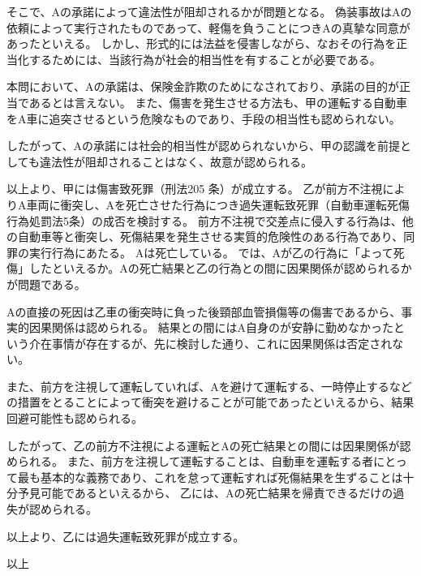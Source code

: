 \documentclass[11pt]{jsarticle}
\begin{document}
		そこで、Aの承諾によって違法性が阻却されるかが問題となる。
		偽装事故はAの依頼によって実行されたものであって、軽傷を負うことにつきAの真摯な同意があったといえる。
		しかし、形式的には法益を侵害しながら、なおその行為を正当化するためには、当該行為が社会的相当性を有することが必要である。
		
		本問において、Aの承諾は、保険金詐欺のためになされており、承諾の目的が正当であるとは言えない。
		また、傷害を発生させる方法も、甲の運転する自動車をA車に追突させるという危険なものであり、手段の相当性も認められない。
		
		したがって、Aの承諾には社会的相当性が認められないから、甲の認識を前提としても違法性が阻却されることはなく、故意が認められる。
		
		以上より、甲には傷害致死罪（刑法205 条）が成立する。
\sectionA{}
	乙が前方不注視によりA車両に衝突し、Aを死亡させた行為につき過失運転致死罪（自動車運転死傷行為処罰法5条）の成否を検討する。
	\sectionB{}
		前方不注視で交差点に侵入する行為は、他の自動車等と衝突し、死傷結果を発生させる実質的危険性のある行為であり、同罪の実行行為にあたる。
		Aは死亡している。
	\sectionB{}
		では、Aが乙の行為に「よって死傷」したといえるか。Aの死亡結果と乙の行為との間に因果関係が認められるかが問題である。
		
		Aの直接の死因は乙車の衝突時に負った後頸部血管損傷等の傷害であるから、事実的因果関係は認められる。
		結果との間にはA自身のが安静に勤めなかったという介在事情が存在するが、先に検討した通り、これに因果関係は否定されない。
		
		また、前方を注視して運転していれば、Aを避けて運転する、一時停止するなどの措置をとることによって衝突を避けることが可能であったといえるから、結果回避可能性も認められる。
		
		したがって、乙の前方不注視による運転とAの死亡結果との間には因果関係が認められる。
	\sectionB{}
		また、前方を注視して運転することは、自動車を運転する者にとって最も基本的な義務であり、これを怠って運転すれば死傷結果を生ずることは十分予見可能であるといえるから、
		乙には、Aの死亡結果を帰責できるだけの過失が認められる。
		
		以上より、乙には過失運転致死罪が成立する。


\begin{flushright}
	以上
\end{flushright}
	
\end{document}
